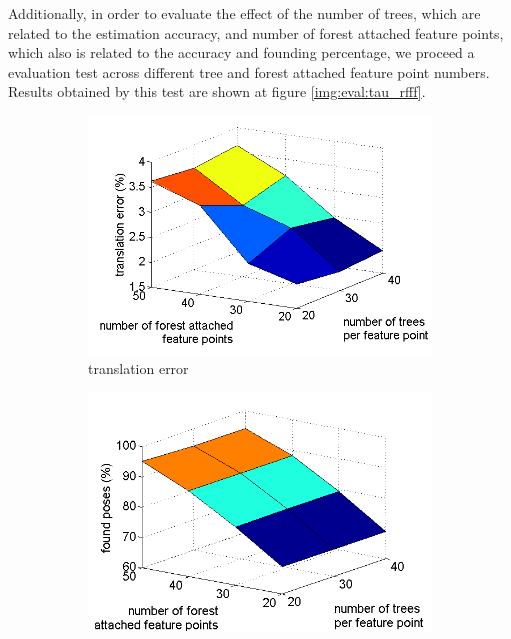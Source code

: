 \documentclass[annual]{acmsiggraph}
\begin{document}
Additionally, in order to evaluate the effect of the number of trees, which are related to the estimation accuracy, and number of forest attached feature points, which also is related to the accuracy and founding percentage, we proceed a evaluation test across different tree and forest attached feature point numbers. Results obtained by this test are shown at figure \ref{img:eval:tau_rfff}.


 \begin{figure}[h]
\center

\begin{subfigure}[c]{0.48\columnwidth} 
	\includegraphics[width=\textwidth]{images/eval_tau_fts_t.png} 
	\caption{translation error}
	\label{img:eval:tau_rfff:t}
\end{subfigure}
\begin{subfigure}[c]{0.48\columnwidth} 
	\includegraphics[width=\textwidth]{images/eval_tau_fts_found.png} 

\end{subfigure}
\end{figure}
\end{document}
